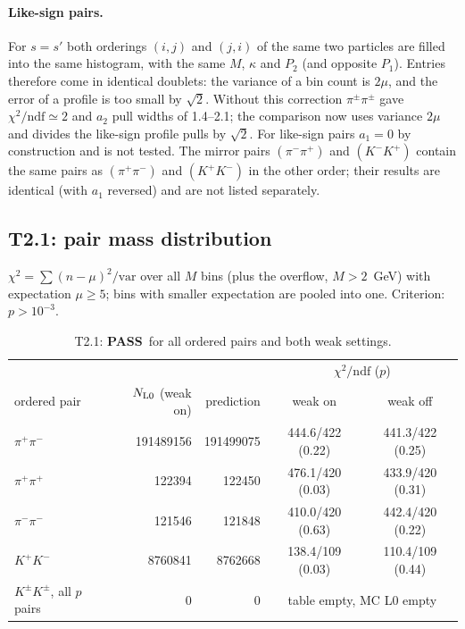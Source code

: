 \documentclass[11pt,a4paper]{article}
\newcommand{\pass}{\textcolor{green!45!black}{\textbf{PASS}}}
\begin{document}
\paragraph{Like-sign pairs.} For $s=s'$ both orderings $(i,j)$ and $(j,i)$ of the same two particles
are filled into the same histogram, with the same $M$, $\kappa$ and $P_2$ (and opposite $P_1$).
Entries therefore come in identical doublets: the variance of a bin count is $2\mu$, and the error
of a profile is too small by $\sqrt2$. Without this correction $\pi^\pm\pi^\pm$ gave
$\chi^2/\text{ndf}\simeq2$ and $a_2$ pull widths of 1.4--2.1; the comparison now uses variance
$2\mu$ and divides the like-sign profile pulls by $\sqrt2$. For like-sign pairs $a_1=0$ by
construction and is not tested. The mirror pairs $(\pi^-\pi^+)$ and $(K^-K^+)$ contain the same
pairs as $(\pi^+\pi^-)$ and $(K^+K^-)$ in the other order; their results are identical (with $a_1$
reversed) and are not listed separately.

\subsection{T2.1: pair mass distribution}

$\chi^2=\sum(n-\mu)^2/\mathrm{var}$ over all $M$ bins (plus the overflow, $M>2$~GeV) with expectation
$\mu\ge5$; bins with smaller expectation are pooled into one. Criterion: $p>10^{-3}$.

\begin{table}[h]
\centering\small
\begin{tabular}{lrrcc}
\toprule
& & & \multicolumn{2}{c}{$\chi^2/\text{ndf}$ ($p$)} \\
ordered pair & $N_{\rm L0}$ (weak on) & prediction & weak on & weak off \\
\midrule
$\pi^+\pi^-$ & 191489156 & 191499075 & 444.6/422 (0.22) & 441.3/422 (0.25) \\
$\pi^+\pi^+$ & 122394 & 122450 & 476.1/420 (0.03) & 433.9/420 (0.31) \\
$\pi^-\pi^-$ & 121546 & 121848 & 410.0/420 (0.63) & 442.4/420 (0.22) \\
$K^+K^-$     & 8760841 & 8762668 & 138.4/109 (0.03) & 110.4/109 (0.44) \\
$K^\pm K^\pm$, all $p$ pairs & 0 & 0 & \multicolumn{2}{c}{table empty, MC L0 empty} \\
\bottomrule
\end{tabular}
\caption{T2.1: \pass\ for all ordered pairs and both weak settings.}
\end{table}
\end{document}
